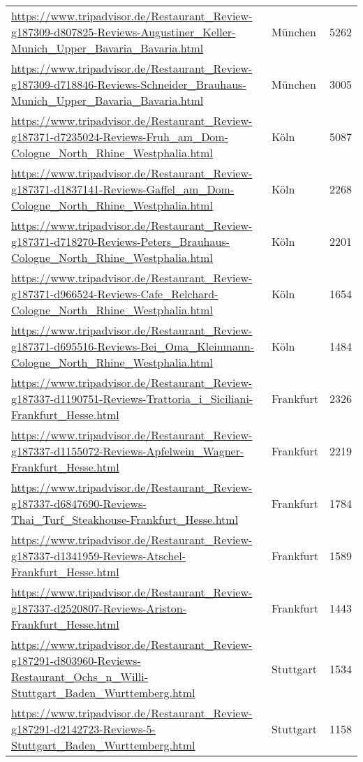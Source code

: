 \begin{table}[]
{\begin{tabular}{lll}
\url{https://www.tripadvisor.de/Restaurant\_Review-g187309-d807825-Reviews-Augustiner\_Keller-Munich\_Upper\_Bavaria\_Bavaria.html} & München & 5262 \\ 
\url{https://www.tripadvisor.de/Restaurant\_Review-g187309-d718846-Reviews-Schneider\_Brauhaus-Munich\_Upper\_Bavaria\_Bavaria.html} & München & 3005 \\ 
\url{https://www.tripadvisor.de/Restaurant\_Review-g187371-d7235024-Reviews-Fruh\_am\_Dom-Cologne\_North\_Rhine\_Westphalia.html} & Köln & 5087 \\ 
\url{https://www.tripadvisor.de/Restaurant\_Review-g187371-d1837141-Reviews-Gaffel\_am\_Dom-Cologne\_North\_Rhine\_Westphalia.html} & Köln & 2268 \\ 
\url{https://www.tripadvisor.de/Restaurant\_Review-g187371-d718270-Reviews-Peters\_Brauhaus-Cologne\_North\_Rhine\_Westphalia.html} & Köln & 2201 \\ 
\url{https://www.tripadvisor.de/Restaurant\_Review-g187371-d966524-Reviews-Cafe\_Relchard-Cologne\_North\_Rhine\_Westphalia.html} & Köln & 1654 \\ 
\url{https://www.tripadvisor.de/Restaurant\_Review-g187371-d695516-Reviews-Bei\_Oma\_Kleinmann-Cologne\_North\_Rhine\_Westphalia.html} & Köln & 1484 \\ 
\url{https://www.tripadvisor.de/Restaurant\_Review-g187337-d1190751-Reviews-Trattoria\_i\_Siciliani-Frankfurt\_Hesse.html} & Frankfurt & 2326 \\ 
\url{https://www.tripadvisor.de/Restaurant\_Review-g187337-d1155072-Reviews-Apfelwein\_Wagner-Frankfurt\_Hesse.html} & Frankfurt & 2219 \\ 
\url{https://www.tripadvisor.de/Restaurant\_Review-g187337-d6847690-Reviews-Thai\_Turf\_Steakhouse-Frankfurt\_Hesse.html} & Frankfurt & 1784 \\ 
\url{https://www.tripadvisor.de/Restaurant\_Review-g187337-d1341959-Reviews-Atschel-Frankfurt\_Hesse.html} & Frankfurt & 1589 \\ 
\url{https://www.tripadvisor.de/Restaurant\_Review-g187337-d2520807-Reviews-Ariston-Frankfurt\_Hesse.html} & Frankfurt & 1443 \\ 
\url{https://www.tripadvisor.de/Restaurant\_Review-g187291-d803960-Reviews-Restaurant\_Ochs\_n\_Willi-Stuttgart\_Baden\_Wurttemberg.html} & Stuttgart & 1534 \\ 
\url{https://www.tripadvisor.de/Restaurant\_Review-g187291-d2142723-Reviews-5-Stuttgart\_Baden\_Wurttemberg.html} & Stuttgart & 1158 \\ 

\end{tabular}}
\end{table}
